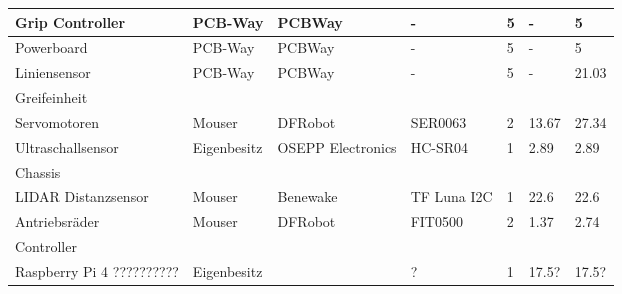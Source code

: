 \documentclass[main.tex]{subfiles} %
\begin{document}
\begin{table}[h]
{\begin{tabular}{|p{3cm}|p{2.5cm}|p{2.5cm}|p{3cm}|p{1cm}|p{1.5cm}|p{1cm}|}
            Grip Controller                         & PCB-Way            & PCBWay                       & -                       & 5               & -                         & 5                           \\ \hline
            Powerboard                              & PCB-Way            & PCBWay                       & -                       & 5               & -                         & 5                           \\ \hline
            Liniensensor                            & PCB-Way            & PCBWay                       & -                       & 5               & -                         & 21.03                       \\ \hline
            \rowcolor{lightgray} Greifeinheit       &                    &                              &                         &                 &                           &                             \\ \hline
            Servomotoren                            & Mouser             & DFRobot                      & SER0063                 & 2               & 13.67                     & 27.34                       \\ \hline
            Ultraschallsensor                       & Eigenbesitz        & OSEPP Electronics            & HC-SR04                 & 1               & 2.89                      & 2.89                        \\ \hline
            \rowcolor{lightgray} Chassis            &                    &                              &                         &                 &                           &                             \\ \hline
            LIDAR Distanzsensor                     & Mouser             & Benewake                     & TF Luna I2C             & 1               & 22.6                      & 22.6                        \\ \hline
            Antriebsräder                           & Mouser             & DFRobot                      & FIT0500                 & 2               & 1.37                      & 2.74                        \\ \hline
            \rowcolor{lightgray} Controller         &                    &                              &                         &                 &                           &                             \\ \hline
            Raspberry Pi 4 ??????????               & Eigenbesitz        &                              & ?                       & 1               & 17.5?                     & 17.5?                       \\ \hline

\end{tabular}}
\end{table}
\end{document}
